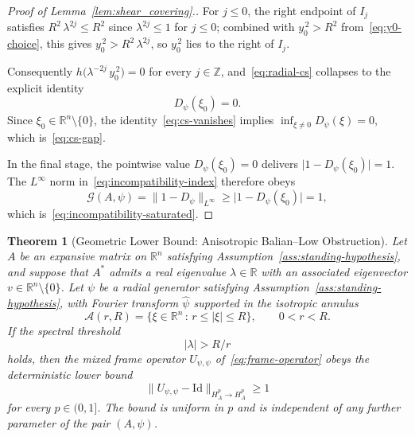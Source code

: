 \documentclass[pdflatex,sn-basic,Numbered]{sn-jnl}
\theoremstyle{thmstyleone}%
\newtheorem{theorem}{Theorem}%
\theoremstyle{thmstylethree}%
\begin{document}
\begin{proof}[Proof of Lemma~\ref{lem:shear_covering}.]
	For $j \le 0$, the right endpoint of $I_{j}$ satisfies
	$R^{2}\, \lambda^{2 j} \le R^{2}$ since $\lambda^{2 j} \le 1$ for $j \le 0$;
	combined with $y_{0}^{\,2} > R^{2}$ from~\eqref{eq:y0-choice}, this gives
	$y_{0}^{\,2} > R^{2}\, \lambda^{2 j}$, so $y_{0}^{\,2}$ lies to the
	right of $I_{j}$.
	
	Consequently $h\!\bigl(\lambda^{-2 j}\, y_{0}^{\,2} \bigr) = 0$ for every
	$j \in \mathbb{Z}$, and~\eqref{eq:radial-cs} collapses to the explicit
	identity
	\begin{equation}\label{eq:cs-vanishes}
		D_{\psi}(\xi_{0})  =  0 .
	\end{equation}
	Since $\xi_{0} \in \mathbb{R}^n \setminus \{0\}$, the
	identity~\eqref{eq:cs-vanishes} implies $\inf_{\xi \ne 0} D_{\psi}(\xi) =
	0$, which is~\eqref{eq:cs-gap}.
	
	In the final stage, the pointwise value $D_{\psi}(\xi_{0}) = 0$ delivers $\bigl| 1 -
	D_{\psi}(\xi_{0}) \bigr| = 1$. The $L^\infty$ norm
	in~\eqref{eq:incompatibility-index} therefore obeys
	\begin{equation*}
		\mathcal{G}(A, \psi)
		 =  \bigl\| 1 - D_{\psi} \bigr\|_{L^\infty}
		 \ge  \bigl| 1 - D_{\psi}(\xi_{0}) \bigr|
		 =  1 ,
	\end{equation*}
	which is~\eqref{eq:incompatibility-saturated}.
\end{proof}


\begin{theorem}[Geometric Lower Bound: Anisotropic Balian--Low Obstruction]\label{thm:geometric_lower_bound}
	Let $A$ be an expansive matrix on $\mathbb{R}^n$ satisfying
	Assumption~\ref{ass:standing-hypothesis}, and suppose that $A^{*}$ admits a
	real eigenvalue $\lambda \in \mathbb{R}$ with an associated eigenvector
	$v \in \mathbb{R}^n \setminus \{0\}$. Let $\psi$ be a radial generator
	satisfying Assumption~\ref{ass:standing-hypothesis}, with Fourier transform
	$\widehat{\psi}$ supported in the isotropic annulus
	\begin{equation*}
		\mathcal{A}(r, R) = \bigl\{ \xi \in \mathbb{R}^n \,:\, r \le |\xi| \le R \bigr\},
		\qquad 0 < r < R .
	\end{equation*}
	If the spectral threshold
	\begin{equation}\label{eq:thm-spectral-threshold}
		|\lambda|  >  R / r
	\end{equation}
	holds, then the mixed frame operator $U_{\psi,\psi}$
	of~\eqref{eq:frame-operator} obeys the deterministic lower bound
	\begin{equation}\label{eq:thm-lower-bound}
		\bigl\| U_{\psi,\psi} - \mathrm{Id} \bigr\|_{H^p_A \to H^p_A}
		 \ge  1
	\end{equation}
	for every $p \in (0, 1]$. The bound is uniform in $p$ and is independent of
	any further parameter of the pair $(A, \psi)$.
\end{theorem}
\end{document}
